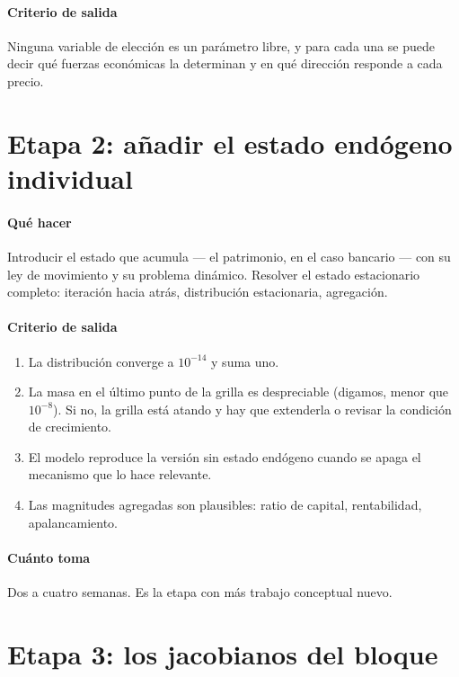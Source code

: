 \paragraph{Criterio de salida} Ninguna variable de elección es un parámetro
libre, y para cada una se puede decir qué fuerzas económicas la determinan y en
qué dirección responde a cada precio.

\section{Etapa 2: añadir el estado endógeno individual}

\paragraph{Qué hacer} Introducir el estado que acumula --- el patrimonio, en el
caso bancario --- con su ley de movimiento y su problema dinámico. Resolver el
estado estacionario completo: iteración hacia atrás, distribución estacionaria,
agregación.

\paragraph{Criterio de salida}
\begin{enumerate}[leftmargin=1.4em,itemsep=1pt]
\item La distribución converge a $10^{-14}$ y suma uno.
\item La masa en el último punto de la grilla es despreciable (digamos, menor
que $10^{-8}$). Si no, la grilla está atando y hay que extenderla o revisar la
condición de crecimiento.
\item El modelo reproduce la versión sin estado endógeno cuando se apaga el
mecanismo que lo hace relevante.
\item Las magnitudes agregadas son plausibles: ratio de capital, rentabilidad,
apalancamiento.
\end{enumerate}

\paragraph{Cuánto toma} Dos a cuatro semanas. Es la etapa con más trabajo
conceptual nuevo.

\section{Etapa 3: los jacobianos del bloque}

